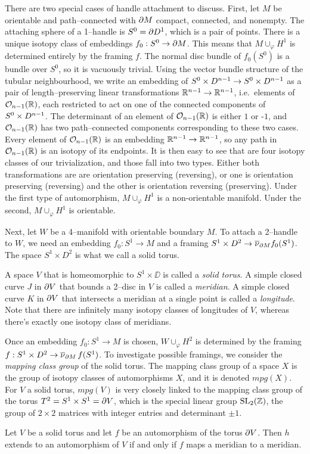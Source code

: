 There are two special cases of handle attachment to discuss.
First, let $M$ be orientable and path--connected with $\partial M$ compact, connected, and nonempty.
The attaching sphere of a 1--handle is $S^0=\partial D^1$, which is a pair of points.
There is a unique isotopy class of embeddings $f_0:S^0\to\partial M$.
This means that $M\cup_\varphi H^1$ is determined entirely by the framing $f$.
The normal disc bundle of $f_0(S^0)$ is a bundle over $S^0$, so it is vacuously trivial.
Using the vector bundle structure of the tubular neighbourhood, we write an embedding of $S^0\times D^{n-1}\to S^0\times D^{n-1}$ as a pair of length--preserving linear transformations $\mathbb{R}^{n-1}\to\mathbb{R}^{n-1}$, i.e.\ elements of $\mathcal{O}_{n-1}({\mathbb{R}})$, each restricted to act on one of the connected components of $S^0\times D^{n-1}$.
The determinant of an element of $\mathcal{O}_{n-1}({\mathbb{R}})$ is either $1$ or -$1$, and $\mathcal{O}_{n-1}({\mathbb{R}})$ has two path--connected components corresponding to these two cases.
Every element of $\mathcal{O}_{n-1}({\mathbb{R}})$ is an embedding $\mathbb{R}^{n-1}\to\mathbb{R}^{n-1}$, so any path in $\mathcal{O}_{n-1}({\mathbb{R}})$ is an isotopy of its endpoints.
It is then easy to see that are four isotopy classes of our trivialization, and those fall into two types.
Either both transformations are are orientation preserving (reversing), or one is orientation preserving (reversing) and the other is orientation reversing (preserving).
Under the first type of automorphism, $M\cup_\varphi H^1$ is a non-orientable manifold.
Under the second, $M\cup_\varphi H^1$ is orientable.

Next, let $W$ be a 4--manifold with orientable boundary $M$.
To attach a 2--handle to $W$, we need an embedding $f_0:S^1\to M$ and a framing $S^1\times D^2\to\overline{\nu}_{\partial M}f_0(S^1)$.
The space $S^1\times D^2$ is what we call a solid torus.

\begin{defn}
	A space $V$ that is homeomorphic to $S^1\times\DD$ is called a \emph{solid torus}.	
	A simple closed curve $J$ in $\partial V$ that bounds a 2--disc in $V$ is called a \emph{meridian}.
	A simple closed curve $K$ in $\partial V$ that intersects a meridian at a single point is called a \emph{longitude}.
	Note that there are infinitely many isotopy classes of longitudes of $V$, whereas there's exactly one isotopy class of meridians.
\end{defn}

Once an embedding $f_0:S^1\to M$ is chosen, $W\cup_\varphi H^2$ is determined by the framing $f:S^1\times D^2\to \overline{\nu}_{\partial M}\,f(S^1)$.
To investigate possible framings, we consider the \emph{mapping class group} of the solid torus.
The mapping class group of a space $X$ is the group of isotopy classes of automorphisms $X$, and it is denoted $mpg(X)$.
For $V$ a solid torus, $mpg(V)$ is very closely linked to the mapping class group of the torus $T^2 = S^1\times S^1=\partial V$, which is the special linear group $\textrm{SL}_2(\mathbb{Z})$, the group of $2\times 2$ matrices with integer entries and determinant $\pm 1$.
\begin{lem}
	Let $V$ be a solid torus and let $f$ be an automorphism of the torus $\partial V$.
	Then $h$ extends to an automorphism of $V$ if and only if $f$ maps a meridian to a meridian.	
\end{lem}

